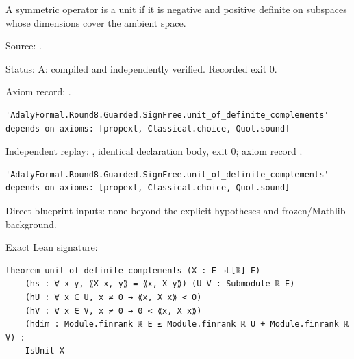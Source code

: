 \begin{theorem}[bp-071]
\label{bp-071}
\uses{}
\leanok
A symmetric operator is a unit if it is negative and positive definite on subspaces whose dimensions cover the ambient space.

\par Source: \texttt{}.
\par Status: A: compiled and independently verified. Recorded exit 0.
\par Axiom record: \texttt{}.
\begin{verbatim}
'AdalyFormal.Round8.Guarded.SignFree.unit_of_definite_complements' depends on axioms: [propext, Classical.choice, Quot.sound]
\end{verbatim}
\par Independent replay: \texttt{}, identical declaration body, exit 0; axiom record \texttt{}.
\begin{verbatim}
'AdalyFormal.Round8.Guarded.SignFree.unit_of_definite_complements' depends on axioms: [propext, Classical.choice, Quot.sound]
\end{verbatim}
\par Direct blueprint inputs: none beyond the explicit hypotheses and frozen/Mathlib background.
\par Exact Lean signature:
\begin{verbatim}
theorem unit_of_definite_complements (X : E →L[ℝ] E)
    (hs : ∀ x y, ⟪X x, y⟫ = ⟪x, X y⟫) (U V : Submodule ℝ E)
    (hU : ∀ x ∈ U, x ≠ 0 → ⟪x, X x⟫ < 0)
    (hV : ∀ x ∈ V, x ≠ 0 → 0 < ⟪x, X x⟫)
    (hdim : Module.finrank ℝ E ≤ Module.finrank ℝ U + Module.finrank ℝ V) :
    IsUnit X
\end{verbatim}
\end{theorem}


